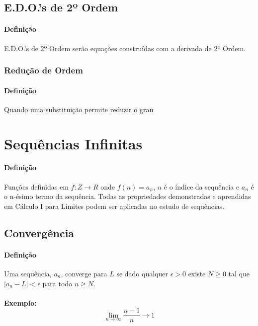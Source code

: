 \documentclass{article}
\begin{document}
        \subsection{E.D.O.'s de 2º Ordem}
            \paragraph{Definição}E.D.O.'s de 2º Ordem serão equações construídas com a derivada de 2º Ordem.

            \subsubsection{Redução de Ordem}
                \paragraph{Definição}Quando uma substituição permite reduzir o grau 


    \section{Sequências Infinitas}
        \paragraph{Definição}Funções definidas em $f:Z\to R$ onde $f(n)=a_{n}$, $n$ é o índice da sequência e $a_{n}$ é o n-ésimo termo da sequência. Todas as propriedades demonstradas e aprendidas em Cálculo I para Limites podem ser aplicadas no estudo de sequências. 
        
        \subsection{Convergência}
            \paragraph{Definição}Uma sequência, $a_{n}$, converge para $L$ se dado qualquer $\epsilon > 0$ existe $N \ge 0$ tal que $|a_{n}-L|<\epsilon$ para todo $n \ge N$.
            \paragraph{}\textbf{Exemplo:}
                \begin{equation}
                    \lim_{n\to\infty}\frac{n-1}{n}\rightarrow1
                \end{equation}
\end{document}

